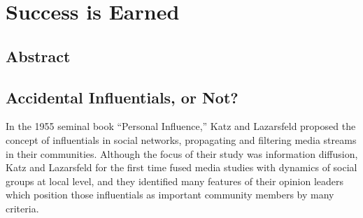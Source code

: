 \documentclass[10pt,oneside]{memoir}
\title{\mytitle}
\author{\myauthor}
\def\mychapterstyle{default}
\def\mypagestyle{headings}
\def\revision{}
\begin{document}
\chapterstyle{\mychapterstyle}
\pagestyle{\mypagestyle}

%
%

\frontmatter



\maketitle
\clearpage

\vspace*{\fill}

\setlength{\parindent}{0pt}

\ifx\mycopyright\undefined
\else
	\textcopyright{} \mycopyright
\fi

\revision

\begin{center}
\end{center}

\setlength{\parindent}{1em}
\clearpage

%
%


\setlength{\parindent}{1em}

\mainmatter
\chapter{Success is Earned}
\label{successisearned}

\section{Abstract}
\label{abstract}

\section{Accidental Influentials, or Not?}
\label{accidentalinfluentialsornot}

In the 1955 seminal book ``Personal Influence,'' Katz and Lazarsfeld proposed the concept of influentials in social networks, propagating and filtering media streams in their communities.  Although the focus of their study was information diffusion, Katz and Lazarsfeld for the first time fused media studies with dynamics of social groups at local level, and they identified many features of their opinion leaders which position those influentials as important community members by many criteria.
\end{document}
